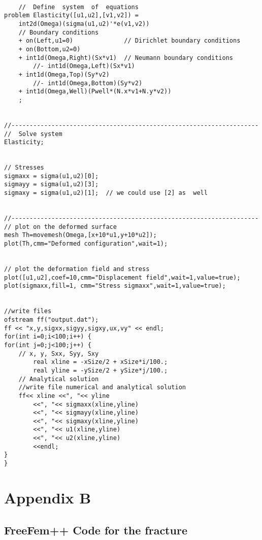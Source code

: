 \documentclass[8pt]{extarticle}
\begin{document}
\begin{verbatim}
    
    //  Define  system  of  equations 
problem Elasticity([u1,u2],[v1,v2]) = 
    int2d(Omega)(sigma(u1,u2)'*e(v1,v2)) 
    // Boundary conditions
    + on(Left,u1=0)              // Dirichlet boundary conditions
    + on(Bottom,u2=0)
    + int1d(Omega,Right)(Sx*v1)  // Neumann boundary conditions
        //- int1d(Omega,Left)(Sx*v1)
    + int1d(Omega,Top)(Sy*v2)
        //- int1d(Omega,Bottom)(Sy*v2)
    + int1d(Omega,Well)(Pwell*(N.x*v1+N.y*v2))
    ;

    
//--------------------------------------------------------------------  
//  Solve system
Elasticity;


// Stresses 
sigmaxx = sigma(u1,u2)[0];
sigmayy = sigma(u1,u2)[3]; 
sigmaxy = sigma(u1,u2)[1];  // we could use [2] as  well


//--------------------------------------------------------------------
// plot on the deformed surface
mesh Th=movemesh(Omega,[x+10*u1,y+10*u2]);
plot(Th,cmm="Deformed configuration",wait=1);


// plot the deformation field and stress
plot([u1,u2],coef=10,cmm="Displacement field",wait=1,value=true);
plot(sigmaxx,fill=1, cmm="Stress sigmaxx",wait=1,value=true);


//write files
ofstream ff("output.dat");
ff << "x,y,sigxx,sigyy,sigxy,ux,vy" << endl;
for(int i=0;i<100;i++) {
for(int j=0;j<100;j++) {
    // x, y, Sxx, Syy, Sxy
        real xline = -xSize/2 + xSize*i/100.;
        real yline = -ySize/2 + ySize*j/100.;
    // Analytical solution
    //write file numerical and analytical solution
    ff<< xline <<", "<< yline 
        <<", "<< sigmaxx(xline,yline)
        <<", "<< sigmayy(xline,yline)
        <<", "<< sigmaxy(xline,yline) 
        <<", "<< u1(xline,yline) 
        <<", "<< u2(xline,yline) 
        <<endl;
}
}

\end{verbatim}

    \newpage

\hypertarget{appendix-b}{%
\section*{Appendix B}\label{appendix-b}}

\hypertarget{freefem-code-for-the-fracture}{%
\subsection*{FreeFem++ Code for the
fracture}\label{freefem-code-for-the-fracture}}
\end{document}

